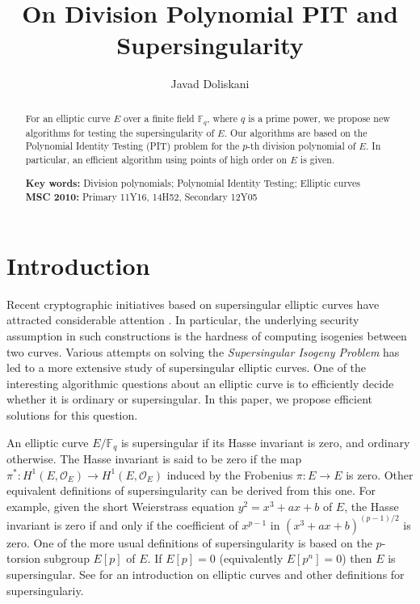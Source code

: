 \documentclass[11pt]{article}
\title{On Division Polynomial PIT and Supersingularity}
\author[1]{Javad Doliskani}
\affil[1]{\small Institute for Quantum Computing, University of Waterloo}
\date{}
\theoremstyle{plain}
\theoremstyle{definition}
\def\F{\ensuremath{\mathbb{F}}}
\begin{document}
\maketitle

\begin{abstract}
	\noindent For an elliptic curve $E$ over a finite field $\F_q$, where $q$ is a prime power, we 
	propose new algorithms for testing the supersingularity of $E$. Our algorithms are based on the 
	Polynomial Identity Testing (PIT) problem for the $p$-th division polynomial of $E$. In 
	particular, an efficient algorithm using points of high order on $E$ is given.
	
	\vspace*{7mm}
	\noindent\textbf{Key words:} Division polynomials; Polynomial Identity Testing; Elliptic curves 
	\\
	\noindent\textbf{MSC 2010:} Primary 11Y16, 14H52, Secondary 12Y05
\end{abstract}




\section{Introduction}
\label{sec:intro}

Recent cryptographic initiatives based on supersingular elliptic curves have attracted considerable 
attention \cite{Jao2011, Jao2014, Charles2009}. In particular, the underlying security assumption 
in such constructions is the hardness of computing isogenies between two curves. Various attempts 
on solving the \textit{Supersingular Isogeny Problem} has led to a more extensive study of 
supersingular elliptic curves. One of the interesting algorithmic questions about an elliptic curve 
is to efficiently decide whether it is ordinary or supersingular. In this paper, we propose 
efficient solutions for this question.

An elliptic curve $E / \F_q$ is supersingular if its Hasse invariant is zero, and ordinary 
otherwise. The Hasse invariant is said to be zero if the map $\pi^*: H^1(E, \mathscr{O}_E) 
\rightarrow H^1(E, \mathscr{O}_E)$ induced by the Frobenius $\pi: E \rightarrow E$ is zero. Other 
equivalent definitions of supersingularity can be derived from this one. For example, given the 
short Weierstrass equation $y^2 = x^3 + ax + b$ of $E$, the Hasse invariant is zero if and only if 
the coefficient of $x^{p - 1}$ in $(x^3 + ax + b)^{(p - 1) / 2}$ is zero. One of the more usual 
definitions of supersingularity is based on the $p$-torsion subgroup $E[p]$ of $E$. If $E[p] = 0$ 
(equivalently $E[p^n] = 0$) then $E$ is supersingular. See \cite{Husemoeller1987} for an 
introduction on elliptic curves and other definitions for supersingulariy. 
\end{document}
